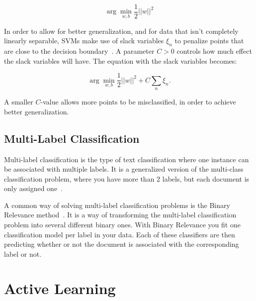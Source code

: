 \begin{equation}
    \arg\min_{w,b}\frac{1}{2}||w||^2
\end{equation}

In order to allow for better generalization, and for data that isn't completely linearly separable, SVMs make use of slack variables $\xi_n$ to penalize points that are close to the decision boundary~\cite{bishop2006pattern}.
A parameter $C>0$ controls how much effect the slack variables will have.
The equation with the slack variables becomes:

\begin{equation}
    \arg\min_{w,b}\frac{1}{2}||w||^2 + C \sum_n\xi_n.
\end{equation}

A smaller $C$-value allows more points to be misclassified, in order to achieve better generalization.

\subsection{Multi-Label Classification}\label{subsec:multi-label-classification}

Multi-label classification is the type of text classification where one instance can be associated with multiple labels.
It is a generalized version of the multi-class classification problem, where you have more than 2 labels, but each document is only assigned one~\cite{tsoumakas2006multi}.

A common way of solving multi-label classification problems is the Binary Relevance method~\cite{read2011classifier, boutell2004learning, luaces2012binary}.
It is a way of transforming the multi-label classification problem into several different binary ones.
With Binary Relevance you fit one classification model per label in your data.
Each of these classifiers are then predicting whether or not the document is associated with the corresponding label or not.

\section{Active Learning}\label{sec:active-learning}

